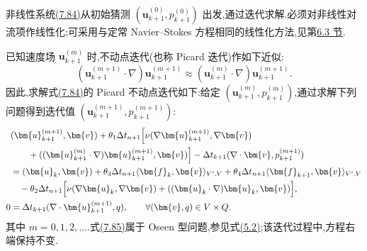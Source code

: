\begin{note}[变分形式的线性化]
\label{note:general-theta-linearization}
非线性系统\hyperref[eq:general-theta-variational]{(7.84)}从初始猜测 $(\bm{u}_{k+1}^{(0)},p_{k+1}^{(0)})$ 出发,通过迭代求解.必须对非线性对流项作线性化;可采用与定常 Navier--Stokes 方程相同的线性化方法,见第\hyperref[sec:steady-ns-iterations]{6.3 节}.

已知速度场 $\bm{u}_{k+1}^{(m)}$ 时,不动点迭代(也称 Picard 迭代)作如下近似:
\[
  (\bm{u}_{k+1}^{(m+1)}\cdot\nabla)\bm{u}_{k+1}^{(m+1)}
  \approx
  (\bm{u}_{k+1}^{(m)}\cdot\nabla)\bm{u}_{k+1}^{(m+1)}.
\]
因此,求解式\hyperref[eq:general-theta-variational]{(7.84)}的 Picard 不动点迭代如下:给定 $(\bm{u}_{k+1}^{(m)},p_{k+1}^{(m)})$,通过求解下列问题得到迭代值 $(\bm{u}_{k+1}^{(m+1)},p_{k+1}^{(m+1)})$:
\begin{equation}\label{eq:general-theta-picard}
\begin{aligned}
  &(\bm{u}_{k+1}^{(m+1)},\bm{v})
   +\theta_1\Delta t_{n+1}\Bigl[
     \nu(\nabla\bm{u}_{k+1}^{(m+1)},\nabla\bm{v})\\
  &\qquad+((\bm{u}_{k+1}^{(m)}\cdot\nabla)
      \bm{u}_{k+1}^{(m+1)},\bm{v})\Bigr]
   -\Delta t_{k+1}(\nabla\cdot\bm{v},p_{k+1}^{(m+1)})\\
  &=(\bm{u}_k,\bm{v})
    +\theta_3\Delta t_{n+1}\langle\bm{f}_k,\bm{v}\rangle_{V',V}
    +\theta_4\Delta t_{n+1}\langle\bm{f}_{k+1},\bm{v}\rangle_{V',V}\\
  &\quad-\theta_2\Delta t_{n+1}\Bigl[
      \nu(\nabla\bm{u}_k,\nabla\bm{v})
      +((\bm{u}_k\cdot\nabla)\bm{u}_k,\bm{v})\Bigr],\\
  0&=\Delta t_{k+1}(\nabla\cdot\bm{u}_{k+1}^{(m+1)},q),
  \qquad \forall (\bm{v},q)\in V\times Q.
\end{aligned}
\end{equation}
其中 $m=0,1,2,\ldots$.式\hyperref[eq:general-theta-picard]{(7.85)}属于 Oseen 型问题,参见式\hyperref[eq:oseen-weak]{(5.2)};该迭代过程中,方程右端保持不变.


\end{note}
